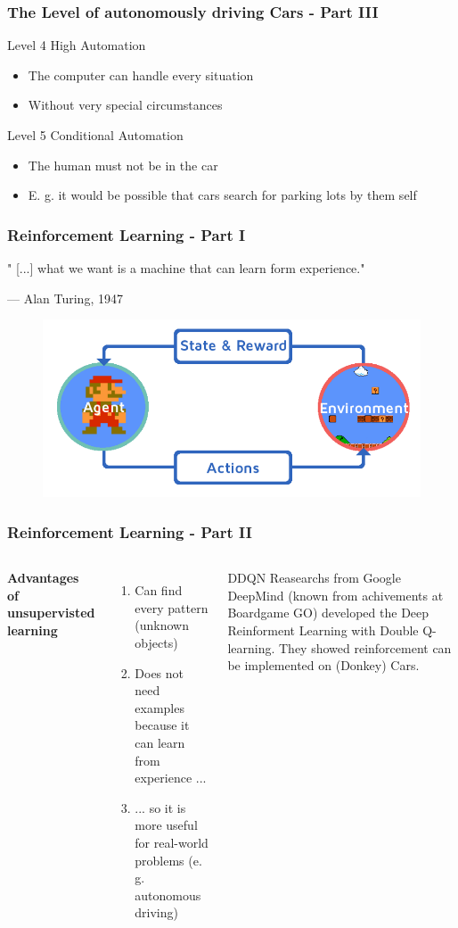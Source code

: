 \documentclass{beamer}
\begin{document}
\begin{frame}
\frametitle{The Level of autonomously driving Cars - Part III}
\begin{block}{Level 4}
High Automation
\begin{itemize}
\item The computer can handle every situation 
\item Without very special circumstances
\end{itemize}
\end{block}
\begin{block}{Level 5}
Conditional Automation
\begin{itemize}
\item The human must not be in the car
\item E. g. it would be possible that cars search for parking lots by them self
\end{itemize}
\end{block}
\end{frame}
%
%
\begin{frame}
\frametitle{Reinforcement Learning - Part I}
\epigraph{ " [...] what we want is a machine that can learn form experience."}{--- \textup{ Alan Turing}, 1947}
\begin{figure}
\includegraphics[width=0.6\linewidth]{photo/rl}
\end{figure}
\end{frame}
%
%
\begin{frame}
\frametitle{Reinforcement Learning - Part II}
\begin{columns}[c] %
\textbf{Advantages of unsupervisted learning}
\begin{enumerate}
\item Can find every pattern (unknown objects)
\item Does not need examples because it can learn from experience ...
\item ... so it is more useful for real-world problems (e. g. autonomous driving)
\end{enumerate}
\begin{block}{DDQN}
Reasearchs from Google DeepMind (known from achivements at Boardgame GO) developed the Deep Reinforment Learning with Double Q-learning. They showed reinforcement can be implemented on (Donkey) Cars. 
\end{block}
\end{columns}
\end{frame}
\end{document}
